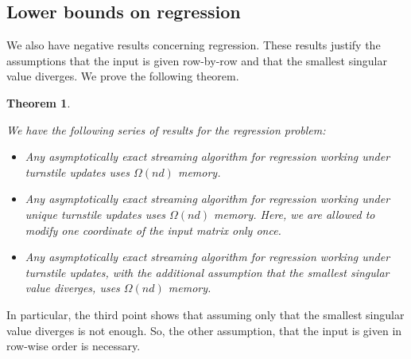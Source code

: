\documentclass[a4paper,11pt,oneside,english,onecolumn]{article}
\newtheorem{theorem}{Theorem}
\theoremstyle{definition}
\begin{document}
\subsection{Lower bounds on regression}

We also have negative results concerning regression. These results justify the assumptions that the input is given row-by-row and that the smallest singular value diverges. We prove the following theorem.
\begin{theorem}
\label{lemma:negativeRegression}

We have the following series of results for the regression problem:
\begin{itemize}
\item Any asymptotically exact streaming algorithm for regression working under turnstile updates uses $\Omega(nd)$ memory.
\item Any asymptotically exact streaming algorithm for regression working under unique turnstile updates uses $\Omega(nd)$ memory. Here, we are allowed to modify one coordinate of the input matrix only once.
\item Any asymptotically exact streaming algorithm for regression working under turnstile updates, with the additional assumption that the smallest singular value diverges, uses $\Omega(nd)$ memory.
\end{itemize}
\end{theorem}

In particular, the third point shows that assuming only that the smallest singular value diverges is not enough. So, the other assumption, that the input is given in row-wise order is necessary.
\end{document}
